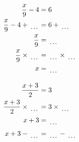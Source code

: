 \documentclass[12pt]{article}
\newcounter{minipagecount}
\begin{document}
\begin{multicols}{2}
\begin{minipage}[t]{0.45\textwidth}
    \raggedright %
    \begin{align*} %
        \frac{x}{9} - 4 &= 6\\
        \frac{x}{9} - 4 + \dotuline{\hspace{5mm}} &= 6 + \dotuline{\hspace{5mm}}\\
        \frac{x}{9} &= \dotuline{\hspace{5mm}}\\
        \frac{x}{9} \times\dotuline{\hspace{5mm}} &= \dotuline{\hspace{5mm}} \times\dotuline{\hspace{5mm}}\\
        x &= \dotuline{\hspace{5mm}}\\
    \end{align*}
\end{minipage} %
\noindent{(\theminipagecount)}\hspace{0.1mm} %
\begin{minipage}[t]{0.45\textwidth} %
    \vspace{-26pt}  %
    \raggedright %
    \begin{align*} %
        \frac{x + 3}{2} &= 3\\
        \frac{x + 3}{2} \times\dotuline{\hspace{5mm}} &= 3 \times\dotuline{\hspace{5mm}}\\
        x + 3 &= \dotuline{\hspace{5mm}}\\
        x + 3 - \dotuline{\hspace{5mm}} &= \dotuline{\hspace{5mm}} - \dotuline{\hspace{5mm}}\\

\end{align*}
\end{minipage}
\end{multicols}
\end{document}
